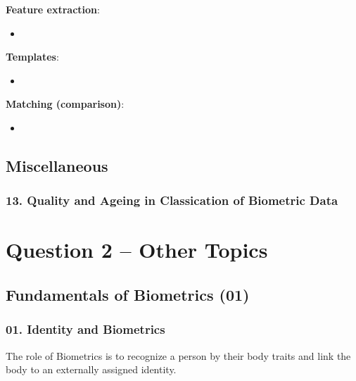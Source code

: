 \documentclass[a4paper]{article}
\begin{document}
      \textbf{Feature extraction}:
      \begin{itemize}
        \item 
      \end{itemize}

      \textbf{Templates}:
      \begin{itemize}
        \item 
      \end{itemize}

      \textbf{Matching (comparison)}:
      \begin{itemize}
        \item 
      \end{itemize}
  \subsection*{Miscellaneous}
    \subsubsection*{13. Quality and Ageing in Classication of Biometric Data}

\newpage

\section*{Question 2 -- Other Topics} %
\label{sec:question_2_other_topics}
  \subsection*{Fundamentals of Biometrics (01)}
    \subsubsection*{01. Identity and Biometrics}
      The role of Biometrics is to recognize a person by their body traits and link the body to an externally assigned identity.
\end{document}
